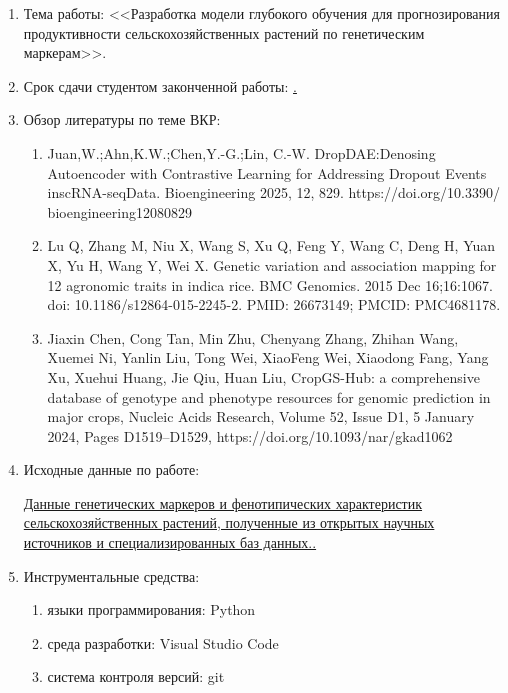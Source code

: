 \begin{enumerate}[1.]
	\item Тема работы: {\expandafter \ulined <<Разработка модели глубокого обучения для прогнозирования продуктивности сельскохозяйственных растений по генетическим маркерам>>.}
	\item Срок сдачи студентом законченной работы: \uline{\thesisDeadline.} 
	\item Обзор литературы по теме ВКР:
		\begin{enumerate}[–]
			\item Juan,W.;Ahn,K.W.;Chen,Y.-G.;Lin, C.-W. DropDAE:Denosing Autoencoder with Contrastive Learning for Addressing Dropout Events inscRNA-seqData. Bioengineering 2025, 12, 829. https://doi.org/10.3390/ bioengineering12080829
			
			\item Lu Q, Zhang M, Niu X, Wang S, Xu Q, Feng Y, Wang C, Deng H, Yuan X, Yu H, Wang Y, 
			Wei X. Genetic variation and association mapping for 12 agronomic traits in indica rice. 
			BMC Genomics. 2015 Dec 16;16:1067. doi: 10.1186/s12864-015-2245-2. PMID: 
			26673149; PMCID: PMC4681178.
			
			\item Jiaxin Chen, Cong Tan, Min Zhu, Chenyang Zhang, Zhihan Wang, Xuemei Ni, Yanlin Liu, 
			Tong Wei, XiaoFeng Wei, Xiaodong Fang, Yang Xu, Xuehui Huang, Jie Qiu, Huan Liu, 
			CropGS-Hub: a comprehensive database of genotype and phenotype resources for genomic 
			prediction in major crops, Nucleic Acids Research, Volume 52, Issue D1, 5 January 2024, 
			Pages D1519–D1529, https://doi.org/10.1093/nar/gkad1062
		\end{enumerate}
	\item Исходные данные по работе: 
	
	\uline{Данные генетических маркеров и фенотипических характеристик сельскохозяйственных 
		растений, полученные из открытых научных источников и специализированных баз данных..}%
	
	\item Инструментальные средства:
	
	\begin{enumerate}[–]
		\item языки программирования: Python
		\item среда разработки: Visual Studio Code
		\item система контроля версий: git
	\end{enumerate}


\end{enumerate}
